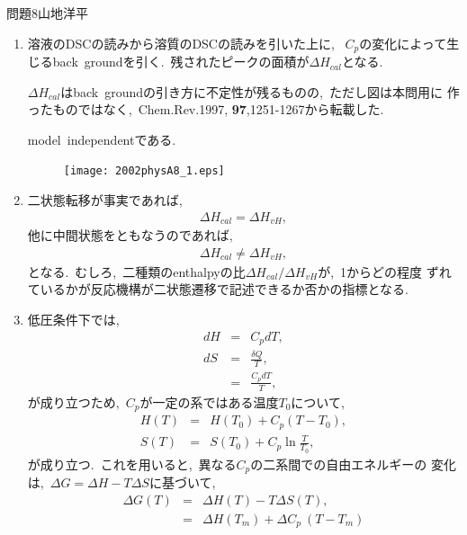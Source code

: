 \documentclass[fleqn]{jbook}
\begin{document}
\begin{answer}{問題8}{山地洋平}
\begin{enumerate}
\begin{eqnarray}
\Delta H &=& - R T \ln K +  T\frac{\partial}{\partial T}R T \ln K, \\
&=&R T^{2}\frac{\partial \ln K}{\partial T},\nonumber
\end{eqnarray}
が得られる.\ これは二状態転移を前提としたvan't\ Hoffのエンタルピー変化に他ならない.
\item
溶液のDSCの読みから溶質のDSCの読みを引いた上に,
\ $C_{p}$の変化によって生じるback\ groundを引く.\
残されたピークの面積が$\Delta H_{cal}$となる.\par
$\Delta H_{cal}$はback\ groundの引き方に不定性が残るものの,\ ただし図は本問用に
作ったものではなく,\ Chem.Rev.1997, {\bf 97},1251-1267から転載した. \par
 model\ independentである.
 
\begin{figure}[htbp]
\begin{center}
\texttt{[image: 2002physA8\_1.eps]}
\end{center}
\end{figure}
\item
二状態転移が事実であれば,\
\begin{eqnarray}
\Delta H_{cal} = \Delta H_{vH},
\end{eqnarray}
他に中間状態をともなうのであれば,\
\begin{eqnarray}
\Delta H_{cal} \neq \Delta H_{vH},
\end{eqnarray}
となる.\ むしろ,\ 二種類のenthalpyの比$\Delta H_{cal} / \Delta H_{vH}$が,\ 1からどの程度
ずれているかが反応機構が二状態遷移で記述できるか否かの指標となる.\
\item
低圧条件下では,
\begin{eqnarray}
dH &=& C_{p}dT,\nonumber\\
dS &=& \frac{\delta Q}{T},\nonumber\\
&=&\frac{C_{p}dT}{T}, \nonumber
\end{eqnarray}
が成り立つため,\ $C_{p}$が一定の系ではある温度$T_{0}$について,
\begin{eqnarray}
H(T)&=&H(T_{0})+C_{p}(T-T_{0}),\nonumber\\
S(T)&=&S(T_{0})+C_{p}\ln \frac{T}{T_{0}},\nonumber
\end{eqnarray}
が成り立つ.\ これを用いると,\ 異なる$C_{p}$の二系間での自由エネルギーの
変化は,\ $\Delta G= \Delta H- T \Delta S$に基づいて,
\begin{eqnarray}
\Delta G (T) &=& \Delta H (T) - T\Delta S (T),\\
&=& \Delta H (T_{m}) + \Delta C_{p}\ (T-T_{m})\nonumber\\

\end{eqnarray}
\end{enumerate}
\end{answer}
\end{document}
